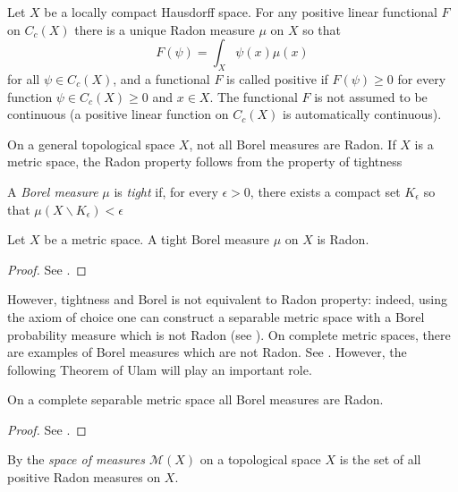 \begin{theorem}
  Let $X$ be a locally compact Hausdorff space. For any positive linear functional $F$ on $C_c(X)$ there is a unique Radon measure $\mu$ on $X$ so that
   \[
     F(\psi) = \int_X \psi(x)\mu(x)
  \]
  for all $\psi \in C_c(X)$, and a functional $F$ is called positive if $F(\psi) \geq 0$ for every function $\psi \in C_c(X) \geq 0$ and $x \in X$. The functional $F$ is not assumed to be continuous (a positive linear function on $C_c(X)$ is automatically continuous).
  \label{thm:Riesz}
\end{theorem}

On a general topological space $X$, not all Borel measures are Radon.
If $X$ is a metric space, the Radon property follows from the property of tightness

\begin{definition}
  A \emph{Borel measure} $\mu$ is \emph{tight} if, for every $\epsilon>0$, there exists a compact set $K_{\epsilon}$ so that $\mu(X \backslash K_{\epsilon}) < \epsilon$
\end{definition}

\begin{proposition}
Let $X$ be a metric space.
A tight Borel measure $\mu$ on $X$ is Radon.
\label{prop:tightborel}
\end{proposition}
\begin{proof}
  See \cite[Proposition~2.1.8]{Bogachev18:WeakConvergence}.
\end{proof}

However, tightness and Borel is not equivalent to Radon property: indeed, using the axiom of choice one can construct a separable metric space with a Borel probability measure which is not Radon (see \cite[Example~1.1.2]{Bogachev18:WeakConvergence}).
On complete metric spaces, there are examples of Borel measures which are not Radon. See \cite[Proposition~4.1.6]{Bogachev18:WeakConvergence}.
However, the following Theorem of Ulam will play an important role.

\begin{theorem}
On a complete separable metric space all Borel measures are Radon.
\label{thm:Ulam}
\end{theorem}
\begin{proof}
  See \cite[Theorem~2.1.9]{Bogachev18:WeakConvergence}.
\end{proof}

\begin{definition}
  By the \emph{space of measures $\mathcal{M}(X)$} on a topological space $X$ is the set of all positive Radon measures on $X$.
\end{definition}


